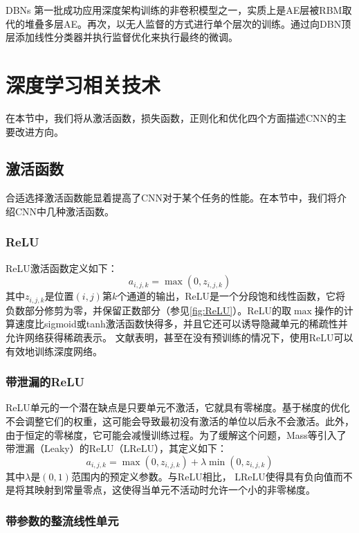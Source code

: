 DBNs \citep{Hinton2009Deep}第一批成功应用深度架构训练的非卷积模型之一，实质上是AE层被RBM取代的堆叠多层AE。再次，以无人监督的方式进行单个层次的训练。通过向DBN顶层添加线性分类器并执行监督优化来执行最终的微调。

\section{深度学习相关技术}
在本节中，我们将从激活函数，损失函数，正则化和优化四个方面描述CNN的主要改进方向。
\subsection{激活函数}
\label{Activationfunctions}
合适选择激活函数能显着提高了CNN对于某个任务的性能。在本节中，我们将介绍CNN中几种激活函数。

\subsubsection{ReLU}

ReLU激活函数定义如下：
\begin{equation}\label{eq:ReLU}
a_{i,j,k}=\max(0,z_{i,j,k})
\end{equation}
其中$ z_{i,j,k} $是位置$ (i,j) $第$k$个通道的输出，ReLU是一个分段饱和线性函数，它将负数部分修剪为零，并保留正数部分（参见\figurename {\ref{fig:ReLU}}）。ReLU的取$ \max $操作的计算速度比sigmoid或tanh激活函数快得多，并且它还可以诱导隐藏单元的稀疏性并允许网络获得稀疏表示。
文献表明，甚至在没有预训练的情况下，使用ReLU可以有效地训练深度网络\cite{Krizhevsky2012}。
\subsubsection{带泄漏的ReLU}

ReLU单元的一个潜在缺点是只要单元不激活，它就具有零梯度。基于梯度的优化不会调整它们的权重，这可能会导致最初没有激活的单位以后永不会激活。此外，由于恒定的零梯度，它可能会减慢训练过程。为了缓解这个问题，Mass等\cite{Maas2013}引入了带泄漏（Leaky）的ReLU（LReLU），其定义如下：
\begin{equation}\label{eq:LReLU}
    a_{i,j,k}=\max(0,z_{i,j,k})+\lambda\min(0,z_{i,j,k})
\end{equation}
其中$ \lambda $是$(0,1)$范围内的预定义参数。与ReLU相比， LReLU使得具有负向值而不是将其映射到常量零点，这使得当单元不活动时允许一个小的非零梯度。
\subsubsection{带参数的整流线性单元}

